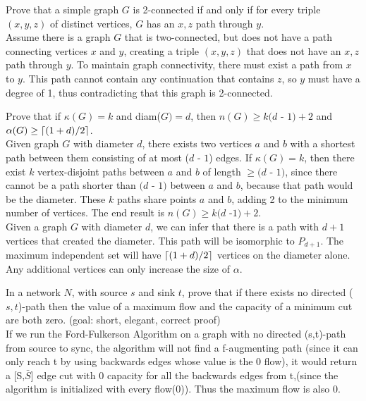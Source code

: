 \documentclass[12pt]{article}
\DeclarePairedDelimiter{\ceil}{\lceil}{\rceil}
\newenvironment{question}[2][Question]{\begin{trivlist}
\item[\hskip \labelsep {\bfseries #1}\hskip \labelsep {\bfseries #2.}]}{\end{trivlist}}
\begin{document}
\begin{question}{7}
Prove that a simple graph $G$ is 2-connected if and only if for every triple $(x, y, z)$ of distinct vertices, $G$ has an $x, z$ path through $y$. \\

Assume there is a graph $G$ that is two-connected, but does not have a path connecting vertices $x$ and $y$, creating a triple $(x, y, z)$ that does not have an $x, z$ path through $y$.  To maintain graph connectivity, there must exist a path from $x$ to $y$.  This path cannot contain any continuation that contains $z$, so $y$ must have a degree of 1, thus contradicting that this graph is 2-connected.
\end{question}

\begin{question}{8}
Prove that if $\kappa(G) = k$ and diam($G) = d$, then $n(G) \geq k(d$ - $ 1) + 2$ and $\alpha(G) \geq \ceil[big]{(1 + d)/2}$.
\\
Given graph $G$ with diameter $d$, there exists two vertices $a$ and $b$ with a shortest path between them consisting of at most ($d$ - $1$) edges.  If $\kappa(G) = k$, then there exist $k$ vertex-disjoint paths between $a$ and $b$ of length $\geq (d$ - $1)$, since there cannot be a path shorter than $(d$ - $1)$ between $a$ and $b$, because that path would be the diameter.  These $k$ paths share points $a$ and $b$, adding 2 to the minimum number of vertices.  The end result is $n(G) \geq k(d$ -$1) +2$.  \\

\noindent
Given a graph $G$ with diameter $d$, we can infer that there is a path with $d+1$ vertices that created the diameter.  This path will be isomorphic to $P_{d+1}$.  The maximum independent set will have $\ceil[big]{(1 + d)/2}$ vertices on the diameter alone.  Any additional vertices can only increase the size of $\alpha$.



\end{question}

\begin{question}{9}
In a network $N$, with source $s$ and sink $t$, prove that if there exists no directed ($s, t$)-path then the value of a maximum flow and the capacity of a minimum cut are both zero. (goal: short, elegant, correct proof) \\

If we run the Ford-Fulkerson Algorithm on a graph with no directed (s,t)-path from source to sync, the algorithm will not find a f-augmenting path (since it can only reach t by using backwards edges whose value is the 0 flow), it would return a [S,$\bar{S}$] edge cut with 0 capacity for all the backwards edges from t,(since the algorithm is initialized with every flow(0)). Thus the maximum flow is also 0.
\end{question}
\end{document}
